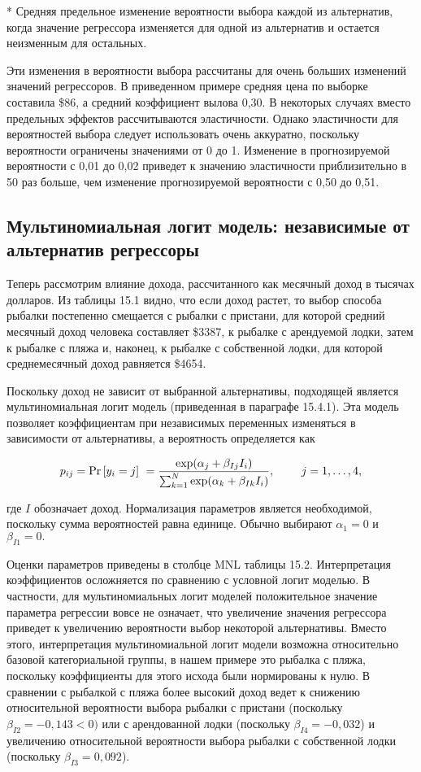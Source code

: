 * Средняя предельное изменение вероятности выбора каждой из альтернатив, когда значение регрессора изменяется для одной из альтернатив и остается неизменным для остальных.

Эти изменения в вероятности выбора рассчитаны для очень больших изменений значений регрессоров. В приведенном примере средняя цена по выборке составила \$86, а средний коэффициент вылова 0,30. В некоторых случаях вместо предельных эффектов рассчитываются эластичности. Однако эластичности для вероятностей выбора следует использовать очень аккуратно, поскольку вероятности ограничены значениями от 0 до 1. Изменение в прогнозируемой вероятности с 0,01 до 0,02 приведет к значению эластичности приблизительно в 50 раз больше, чем изменение прогнозируемой вероятности с 0,50 до 0,51. 

\subsection{Мультиномиальная логит модель: независимые от альтернатив регрессоры}

Теперь рассмотрим влияние дохода, рассчитанного как месячный доход в тысячах долларов. Из таблицы 15.1 видно, что если доход растет, то выбор способа рыбалки постепенно смещается с рыбалки с пристани, для которой средний месячный доход человека составляет \$3387, к рыбалке с арендуемой лодки, затем к рыбалке с пляжа и, наконец, к рыбалке с собственной лодки, для которой среднемесячный доход равняется \$4654.

Поскольку доход не зависит от выбранной альтернативы, подходящей является мультиномиальная логит модель (приведенная в параграфе 15.4.1). Эта модель позволяет коэффициентам при независимых переменных изменяться в зависимости от альтернативы, а вероятность определяется как

\[p_{ij}={\Pr  \left[y_i=j\right]\ }=
\frac{{\rm exp}({\alpha }_j+{\beta }_{Ij}I_i)}
{\sum^N_{k=1}{{\rm exp}({\alpha }_k+{\beta }_{Ik}I_i)}},
\ \ \ \ \ \ \ j=1,\dots ,4,\] 

где $I$ обозначает доход. Нормализация параметров является необходимой, поскольку сумма вероятностей равна единице. Обычно выбирают ${\alpha }_1=0$ и ${\beta }_{I1}=0.$

Оценки параметров приведены в столбце MNL таблицы 15.2. Интерпретация коэффициентов осложняется по сравнению с условной логит моделью. В частности, для мультиномиальных логит моделей положительное значение параметра регрессии вовсе не означает, что увеличение значения регрессора приведет к увеличению вероятности выбор некоторой альтернативы. Вместо этого, интерпретация мультиномиальной логит модели возможна относительно базовой категориальной группы, в нашем примере это рыбалка с пляжа, поскольку коэффициенты для этого исхода были нормированы к нулю. В сравнении с рыбалкой с пляжа более высокий доход ведет к снижению относительной вероятности выбора рыбалки с пристани (поскольку ${\beta }_{I2}=-0,143<0)$ или с арендованной лодки (поскольку ${\beta }_{I4}=-0,032$) и увеличению относительной вероятности выбора рыбалки с собственной лодки (поскольку ${\beta }_{I3}=0,092$).

